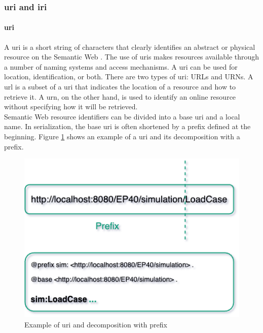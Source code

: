     \subsubsection{\acrshort{uri} and \acrshort{iri}}
        \paragraph{\acrfull{uri}}
        A \acrshort{uri} is a short string of characters that clearly identifies an abstract or physical resource on the Semantic Web \cite{de2016names}. The use of \acrshort{uri}s makes resources available through a number of naming systems and access mechanisms. A \acrshort{uri} can be used for location, identification, or both. There are two types of \acrshort{uri}: URLs and URNs. A \acrfull{url} is a subset of a \acrshort{uri} that indicates the location of a resource and how to retrieve it. A \acrfull{urn}, on the other hand, is used to identify an online resource without specifying how it will be retrieved.\\

        Semantic Web resource identifiers can be divided into a base \acrshort{uri} and a local name. In serialization, the base \acrshort{uri} is often shortened by a prefix defined at the beginning. Figure  \ref{fig:uri-example} shows an example of a \acrshort{uri} and its decomposition with a prefix.\\

        \begin{figure}[h]
            \centering
            \includegraphics[scale=0.6]{images/Foundation-URI Decomposition.drawio.png}
            \caption{\label{fig:uri-example} Example of \acrshort{uri} and decomposition with prefix}
        \end{figure}

